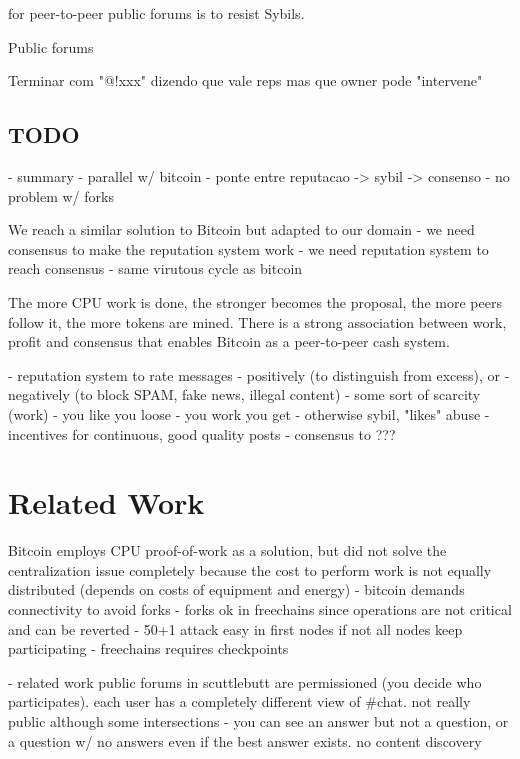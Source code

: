 \documentclass[10pt,journal,compsoc]{IEEEtran}
\begin{document}
for peer-to-peer public forums is to resist Sybils.


Public forums

Terminar com "@!xxx" dizendo que vale reps mas que owner pode "intervene"


\subsection{TODO}

- summary
    - parallel w/ bitcoin
        - ponte entre reputacao -> sybil -> consenso
    - no problem w/ forks

We reach a similar solution to Bitcoin but adapted to our domain
- we need consensus to make the reputation system work
- we need reputation system to reach consensus
- same virutous cycle as bitcoin

The more CPU work is done, the stronger becomes the proposal, the more peers
follow it, the more tokens are mined.
There is a strong association between work, profit and consensus that enables
Bitcoin as a peer-to-peer cash system.

- reputation system to rate messages
    - positively (to distinguish from excess), or
    - negatively (to block SPAM, fake news, illegal content)
- some sort of scarcity (work)
    - you like you loose
    - you work you get
    - otherwise sybil, "likes" abuse
    - incentives for continuous, good quality posts
- consensus to ???

\section{Related Work}
\label{sec.related}

Bitcoin employs CPU proof-of-work as a solution, but did not solve the
centralization issue completely because the cost to perform work is not
equally distributed
(depends on costs of equipment and energy)
    - bitcoin demands connectivity to avoid forks
    - forks ok in freechains since operations are not critical and can be reverted
    - 50+1 attack easy in first nodes if not all nodes keep participating
        - freechains requires checkpoints

- related work public forums in scuttlebutt are permissioned (you decide who
  participates). each user has a completely different view of \#chat. not really
  public although some intersections
    - you can see an answer but not a question, or a question w/ no answers
      even if the best answer exists. no content discovery
\end{document}
